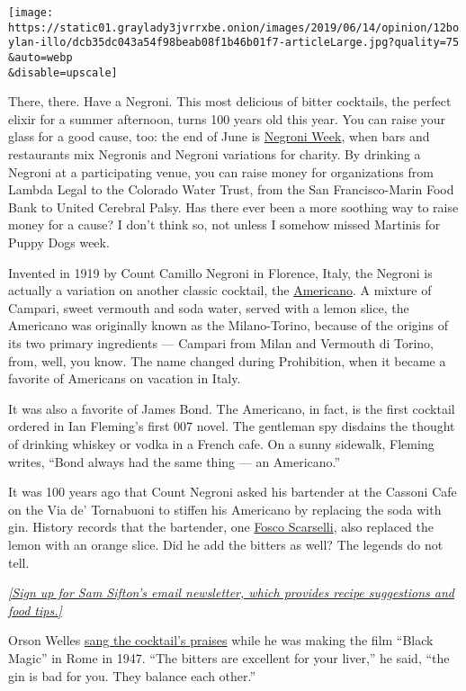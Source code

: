 \texttt{[image: https://static01.graylady3jvrrxbe.onion/images/2019/06/14/opinion/12boylan-illo/dcb35dc043a54f98beab08f1b46b01f7-articleLarge.jpg?quality=75\\\&auto=webp\\\&disable=upscale]}

There, there. Have a Negroni. This most delicious of bitter cocktails,
the perfect elixir for a summer afternoon, turns 100 years old this
year. You can raise your glass for a good cause, too: the end of June is
\href{https://negroniweek.com/}{Negroni Week}, when bars and restaurants
mix Negronis and Negroni variations for charity. By drinking a Negroni
at a participating venue, you can raise money for organizations from
Lambda Legal to the Colorado Water Trust, from the San Francisco-Marin
Food Bank to United Cerebral Palsy. Has there ever been a more soothing
way to raise money for a cause? I don't think so, not unless I somehow
missed Martinis for Puppy Dogs week.

Invented in 1919 by Count Camillo Negroni in Florence, Italy, the
Negroni is actually a variation on another classic cocktail, the
\href{https://www.thespruceeats.com/americano-cocktail-recipe-759279}{Americano}.
A mixture of Campari, sweet vermouth and soda water, served with a lemon
slice, the Americano was originally known as the Milano-Torino, because
of the origins of its two primary ingredients --- Campari from Milan and
Vermouth di Torino, from, well, you know. The name changed during
Prohibition, when it became a favorite of Americans on vacation in
Italy.

It was also a favorite of James Bond. The Americano, in fact, is the
first cocktail ordered in Ian Fleming's first 007 novel. The gentleman
spy disdains the thought of drinking whiskey or vodka in a French cafe.
On a sunny sidewalk, Fleming writes, ``Bond always had the same thing
--- an Americano.''

It was 100 years ago that Count Negroni asked his bartender at the
Cassoni Cafe on the Via de' Tornabuoni to stiffen his Americano by
replacing the soda with gin. History records that the bartender, one
\href{https://www.diffordsguide.com/people/51630/bartender/fosco-scarselli}{Fosco
Scarselli}, also replaced the lemon with an orange slice. Did he add the
bitters as well? The legends do not tell.

\href{https://www.nytimes3xbfgragh.onion/newsletters/cooking}{\emph{{[}Sign
up for Sam Sifton's email newsletter, which provides recipe suggestions
and food tips.{]}}}

Orson Welles
\href{http://www.ahistoryofdrinking.com/wordpress/orson-welles-and-the-negroni/}{sang
the cocktail's praises} while he was making the film ``Black Magic'' in
Rome in 1947. ``The bitters are excellent for your liver,'' he said,
``the gin is bad for you. They balance each other.''

